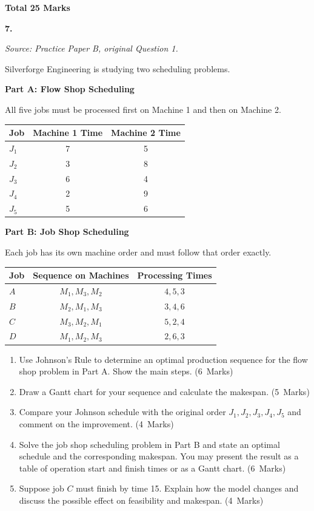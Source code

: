 \documentclass[11pt,a4paper]{article}
\newcommand{\markalloc}[1]{\nobreak\hfill\mbox{(#1 Marks)}}
\newcommand{\questiontotal}[1]{\begin{flushright}\textbf{Total #1 Marks}\end{flushright}}
\begin{document}
\questiontotal{25}

\newpage

\textbf{7.}

\textit{Source: Practice Paper B, original Question 1.}



Silverforge Engineering is studying two scheduling problems.

\textbf{Part A: Flow Shop Scheduling}

All five jobs must be processed first on Machine 1 and then on Machine 2.

\begin{center}
\begin{tabular}{lcc}
\toprule
Job & Machine 1 Time & Machine 2 Time \\
\midrule
$J_1$ & 7 & 5 \\
$J_2$ & 3 & 8 \\
$J_3$ & 6 & 4 \\
$J_4$ & 2 & 9 \\
$J_5$ & 5 & 6 \\
\bottomrule
\end{tabular}
\end{center}

\textbf{Part B: Job Shop Scheduling}

Each job has its own machine order and must follow that order exactly.

\begin{center}
\begin{tabular}{lcc}
\toprule
Job & Sequence on Machines & Processing Times \\
\midrule
$A$ & $M_1, M_3, M_2$ & $4, 5, 3$ \\
$B$ & $M_2, M_1, M_3$ & $3, 4, 6$ \\
$C$ & $M_3, M_2, M_1$ & $5, 2, 4$ \\
$D$ & $M_1, M_2, M_3$ & $2, 6, 3$ \\
\bottomrule
\end{tabular}
\end{center}

\begin{enumerate}
\item Use Johnson's Rule to determine an optimal production sequence for the flow shop problem in Part A. Show the main steps. \markalloc{6}

\item Draw a Gantt chart for your sequence and calculate the makespan. \markalloc{5}

\item Compare your Johnson schedule with the original order $J_1,J_2,J_3,J_4,J_5$ and comment on the improvement. \markalloc{4}

\item Solve the job shop scheduling problem in Part B and state an optimal schedule and the corresponding makespan. You may present the result as a table of operation start and finish times or as a Gantt chart. \markalloc{6}

\item Suppose job $C$ must finish by time 15. Explain how the model changes and discuss the possible effect on feasibility and makespan. \markalloc{4}
\end{enumerate}
\end{document}
